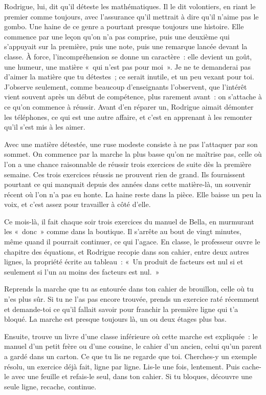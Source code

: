 \documentclass[10.5pt,twoside,openright]{book}
\newcommand{\soustitre}[1]{\par\vspace{1.1em}\noindent{\bfseries\color{accent}#1}\par\vspace{0.4em}\noindent}
\begin{document}
Rodrigue, lui, dit qu’il déteste les mathématiques. Il le dit volontiers, en riant le premier comme toujours, avec l’assurance qu’il mettrait à dire qu’il n’aime pas le gombo. Une haine de ce genre a pourtant presque toujours une histoire. Elle commence par une leçon qu’on n’a pas comprise, puis une deuxième qui s’appuyait sur la première, puis une note, puis une remarque lancée devant la classe. À force, l’incompréhension se donne un caractère : elle devient un goût, une humeur, une matière « qui n’est pas pour moi ». Je ne te demanderai pas d’aimer la matière que tu détestes ; ce serait inutile, et un peu vexant pour toi. J’observe seulement, comme beaucoup d’enseignants l’observent, que l’intérêt vient souvent après un début de compétence, plus rarement avant : on s’attache à ce qu’on commence à réussir. Avant d’en réparer un, Rodrigue aimait démonter les téléphones, ce qui est une autre affaire, et c’est en apprenant à les remonter qu’il s’est mis à les aimer.

Avec une matière détestée, une ruse modeste consiste à ne pas l’attaquer par son sommet. On commence par la marche la plus basse qu’on ne maîtrise pas, celle où l’on a une chance raisonnable de réussir trois exercices de suite dès la première semaine. Ces trois exercices réussis ne prouvent rien de grand. Ils fournissent pourtant ce qui manquait depuis des années dans cette matière-là, un souvenir récent où l’on n’a pas eu honte. La haine reste dans la pièce. Elle baisse un peu la voix, et c’est assez pour travailler à côté d’elle.

Ce mois-là, il fait chaque soir trois exercices du manuel de Bella, en murmurant les « donc » comme dans la boutique. Il s’arrête au bout de vingt minutes, même quand il pourrait continuer, ce qui l’agace. En classe, le professeur ouvre le chapitre des équations, et Rodrigue recopie dans son cahier, entre deux autres lignes, la propriété écrite au tableau : « Un produit de facteurs est nul si et seulement si l’un au moins des facteurs est nul. »

\soustitre{Ce soir, essaie ceci}

Reprends la marche que tu as entourée dans ton cahier de brouillon, celle où tu n’es plus sûr. Si tu ne l’as pas encore trouvée, prends un exercice raté récemment et demande-toi ce qu’il fallait savoir pour franchir la première ligne qui t’a bloqué. La marche est presque toujours là, un ou deux étages plus bas.

Ensuite, trouve un livre d’une classe inférieure où cette marche est expliquée : le manuel d’un petit frère ou d’une cousine, le cahier d’un ancien, celui qu’un parent a gardé dans un carton. Ce que tu lis ne regarde que toi. Cherches-y un exemple résolu, un exercice déjà fait, ligne par ligne. Lis-le une fois, lentement. Puis cache-le avec une feuille et refais-le seul, dans ton cahier. Si tu bloques, découvre une seule ligne, recache, continue.
\end{document}

